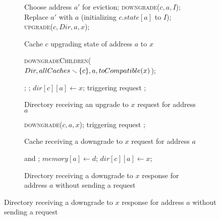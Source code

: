 \begin{figure}

\begin{subfigure}{\linewidth}
\begin{boxedminipage}{\linewidth}
\begin{algorithmic}
    \State Choose address $a'$ for eviction;
    \State \textsc{downgrade}($c, a, I$);
    \State Replace $a'$ with $a$ (initializing $c.state[a]$ to $I$);
  \EndIf
  \State \call{} \textsc{upgrade}($c, Dir, a, x$);
\EndIf
\end{algorithmic}
\end{boxedminipage}
\caption{Cache $c$ upgrading state of address $a$ to $x$}
\label{cacheUp}
\end{subfigure}

\begin{subfigure}{\linewidth}
\begin{boxedminipage}{\linewidth}
\begin{algorithmic}
  \State \call{} \parbox[t]{\dimexpr\linewidth-\algorithmicindent}
           {\textsc{downgradeChildren}($\newline Dir, allCaches
              \smallsetminus \{c\}, a, toCompatible(x)$);}
    \State \send{} ;
  \EndIf
  \State \send{} ;
  \State $dir[c][a] \gets x$;
  \State \remove{} triggering request ;
\EndIf
\end{algorithmic}
\end{boxedminipage}
\caption{Directory receiving an upgrade to $x$ request for address $a$}
\label{dirDown}
\end{subfigure}

\begin{subfigure}{\linewidth}
\begin{boxedminipage}{\linewidth}
\begin{algorithmic}
  \State \call{} \textsc{downgrade}($c, a, x$);
  \State \remove{} triggering request ;
\EndIf
\end{algorithmic}
\end{boxedminipage}
\caption{Cache receiving a downgrade to $x$ request for address $a$}
\label{cacheDown}
\end{subfigure}

\begin{subfigure}{\linewidth}
\begin{boxedminipage}{\linewidth}
\begin{algorithmic}
    \State \receive{} and \remove{} ;
    \State $memory[a] \gets d$;
  \EndIf
  \State $dir[c][a] \gets x$;
\EndIf
\end{algorithmic}
\end{boxedminipage}
\caption{Directory receiving a downgrade to $x$ response for address $a$
without sending a request}
\label{dirDown}
\end{subfigure}


\end{figure}
